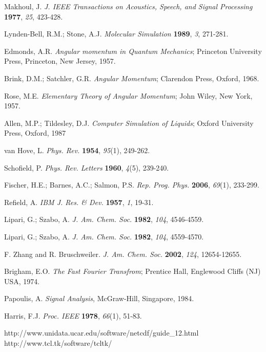 \documentclass[a4paper,11pt]{report}
\begin{document}
\begin{thebibliography}{99}
 Makhoul, J. \textit{J. IEEE Transactions on Acoustics, Speech, and Signal Processing} \textbf{1977}, \textit{25}, 423-428.

 Lynden-Bell, R.M.; Stone, A.J. \textit{Molecular Simulation} \textbf{1989}, \textit{3}, 271-281.

 Edmonds, A.R. \textit{Angular momentum in Quantum Mechanics}; Princeton University Press, Princeton, 
New Jersey, 1957.

 Brink, D.M.; Satchler, G.R. \textit{Angular Momentum}; Clarendon Press, Oxford, 1968.

 Rose, M.E. \textit{Elementary Theory of Angular Momentum}; John Wiley, New York, 1957.

 Allen, M.P.; Tildesley, D.J. \textit{Computer Simulation of Liquids}; Oxford University Press, Oxford, 1987

 van Hove, L. \textit{Phys.  Rev.} \textbf{1954}, \textit{95}(1), 249-262.

 Schofield, P. \textit{Phys. Rev. Letters} \textbf{1960}, \textit{4}(5), 239-240.

 Fischer, H.E.; Barnes, A.C.; Salmon, P.S. \textit{Rep. Prog. Phys.} \textbf{2006}, \textit{69}(1), 233-299.

 Refield, A. \textit{IBM J. Res. \& Dev.} \textbf{1957}, \textit{1}, 19-31.

 Lipari, G.; Szabo, A. \textit{J. Am. Chem. Soc.} \textbf{1982}, \textit{104}, 4546-4559. 

 Lipari, G.; Szabo, A. \textit{J. Am. Chem. Soc.} \textbf{1982}, \textit{104}, 4559-4570.

 F. Zhang and R. Bruschweiler. \textit{J. Am. Chem. Soc.} \textbf{2002}, \textit{124}, 12654-12655.

 Brigham, E.O. \textit{The Fast Fourier Transfrom}; Prentice Hall, Englewood Cliffs (NJ) USA, 1974.

 Papoulis, A. \textit{Signal Analysis}, McGraw-Hill, Singapore, 1984.

 Harris, F.J. \textit{Proc. IEEE} \textbf{1978}, \textit{66}(1), 51-83.

 http://www.unidata.ucar.edu/software/netcdf/guide\_12.html
 http://www.tcl.tk/software/tcltk/
\end{thebibliography}
\end{document}
